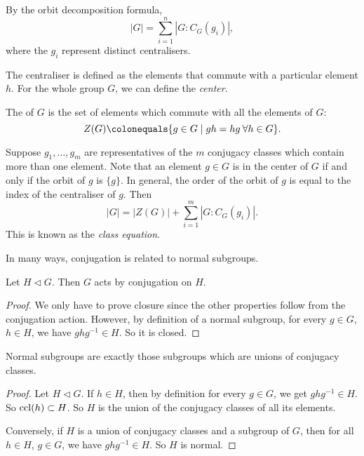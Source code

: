 By the orbit decomposition formula,
\[|G|=\sum_{i=1}^{n}|G:C_G(g_i)|,\]
where the $g_i$ represent distinct centralisers.

The centraliser is defined as the elements that commute with a particular element $h$. For the whole group $G$, we can define the \emph{center}.

\begin{definition}[Center]
The  of $G$ is the set of elements which commute with all the elements of $G$:
\[Z(G)\colonequals\{g\in G\mid gh=hg\:\forall h\in G\}.\]
\end{definition}

Suppose $g_1,\dots,g_m$ are representatives of the $m$ conjugacy classes which contain more than one element. 
Note that an element $g\in G$ is in the center of $G$ if and only if the orbit of $g$ is $\{g\}$.  
In general, the order of the orbit of $g$ is equal to the index of the centraliser of $g$.
Then
\begin{equation}
|G|=|Z(G)|+\sum_{i=1}^{m}|G:C_G(g_i)|.
\end{equation}
This is known as the \emph{class equation}.

In many ways, conjugation is related to normal subgroups.

\begin{lemma}
Let $H\triangleleft G$. Then $G$ acts by conjugation on $H$.
\end{lemma}

\begin{proof}
We only have to prove closure since the other properties follow from the conjugation action. However, by definition of a normal subgroup, for every $g\in G$, $h\in H$, we have $ghg^{-1}\in H$. So it is closed.
\end{proof}

\begin{proposition}
Normal subgroups are exactly those subgroups which are unions of conjugacy classes.
\end{proposition}

\begin{proof}
Let $H\triangleleft G$. If $h\in H$, then by definition for every $g\in G$, we get $ghg^{-1}\in H$. So $\operatorname{ccl}(h)\subset H$. So $H$ is the union of the conjugacy classes of all its elements.

Conversely, if $H$ is a union of conjugacy classes and a subgroup of $G$, then for all $h\in H$, $g\in G$, we have $ghg^{-1}\in H$. So $H$ is normal.
\end{proof}

